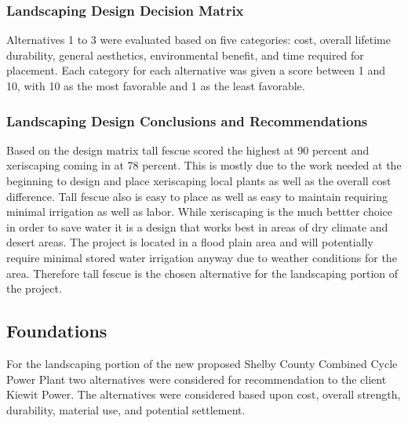 \documentclass{ceri}
\begin{document}
\subsubsection{Landscaping Design Decision Matrix}
Alternatives 1 to 3 were evaluated based on five categories: cost, overall lifetime durability, general aesthetics, environmental benefit, and time required for placement. Each category for each 	alternative was given a score between 1 and 10, with 10 as the most favorable and 1 as the least favorable. 

\begin{table}[H]
\centering
\caption{Landscaping Design Decision Matrix}
\label{my-label}
\end{table}

\subsubsection{Landscaping Design Conclusions and Recommendations}
Based on the design matrix tall fescue scored the highest at 90 percent and xeriscaping coming in at 78 percent. This is mostly due to the work needed at the beginning to design and place xeriscaping local plants as well as the overall cost difference. Tall fescue also is easy to place as well as easy to maintain requiring minimal irrigation as well as labor. While xeriscaping is the much bettter choice in order to save water it is a design that works best in areas of dry climate and desert areas. The project is located in a flood plain area and will potentially require minimal stored water irrigation anyway due to weather conditions for the area. Therefore tall fescue is the chosen alternative for the landscaping portion of the project.
\newpage
\subsection{Foundations}
For the landscaping portion of the new proposed Shelby County Combined Cycle Power Plant two alternatives were considered for recommendation to the client Kiewit Power. The alternatives were considered based upon cost, overall strength, durability, material use, and potential settlement.
\end{document}
